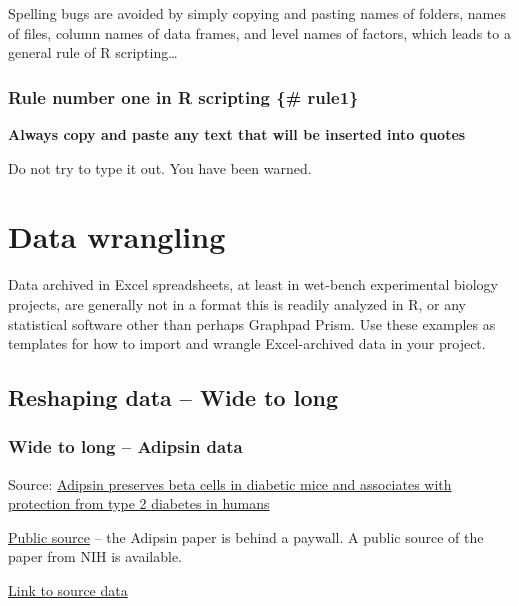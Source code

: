 \documentclass[]{book}
\begin{document}
Spelling bugs are avoided by simply copying and pasting names of folders, names of files, column names of data frames, and level names of factors, which leads to a general rule of R scripting\ldots{}

\hypertarget{rule-number-one-in-r-scripting-rule1}{%
\subsubsection{Rule number one in R scripting \{\# rule1\}}\label{rule-number-one-in-r-scripting-rule1}}

\textbf{Always copy and paste any text that will be inserted into quotes}

Do not try to type it out. You have been warned.

\hypertarget{data-wrangling}{%
\section{Data wrangling}\label{data-wrangling}}

Data archived in Excel spreadsheets, at least in wet-bench experimental biology projects, are generally not in a format this is readily analyzed in R, or any statistical software other than perhaps Graphpad Prism. Use these examples as templates for how to import and wrangle Excel-archived data in your project.

\hypertarget{reshaping-data-wide-to-long}{%
\subsection{Reshaping data -- Wide to long}\label{reshaping-data-wide-to-long}}

\hypertarget{wide-to-long-adipsin-data}{%
\subsubsection{Wide to long -- Adipsin data}\label{wide-to-long-adipsin-data}}

Source: \href{https://www.nature.com/articles/s41591-019-0610-4}{Adipsin preserves beta cells in diabetic mice and associates with protection from type 2 diabetes in humans}

\href{https://www.ncbi.nlm.nih.gov/pmc/articles/PMC7256970/}{Public source} -- the Adipsin paper is behind a paywall. A public source of the paper from NIH is available.

\href{https://www.nature.com/articles/s41591-019-0610-4\#Sec39}{Link to source data}
\end{document}
